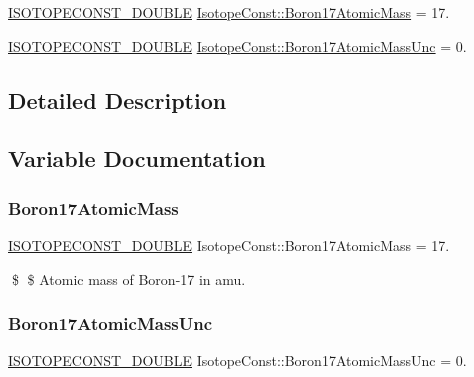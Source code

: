 \begin{DoxyCompactItemize}
\item 
\mbox{\hyperlink{group___isotope_const-_macros_ga8f45a7272ce02c0b4c65c44636ed719a}{I\+S\+O\+T\+O\+P\+E\+C\+O\+N\+S\+T\+\_\+\+D\+O\+U\+B\+LE}} \mbox{\hyperlink{group___isotope_const-_boron-_b17_ga5616ca5a656c254e4e7f03ea4de4c0ac}{Isotope\+Const\+::\+Boron17\+Atomic\+Mass}} = 17.
\item 
\mbox{\hyperlink{group___isotope_const-_macros_ga8f45a7272ce02c0b4c65c44636ed719a}{I\+S\+O\+T\+O\+P\+E\+C\+O\+N\+S\+T\+\_\+\+D\+O\+U\+B\+LE}} \mbox{\hyperlink{group___isotope_const-_boron-_b17_gad3cb8f812ed1fc6926c2b1475fffe654}{Isotope\+Const\+::\+Boron17\+Atomic\+Mass\+Unc}} = 0.
\end{DoxyCompactItemize}


\subsection{Detailed Description}


\subsection{Variable Documentation}
\mbox{\label{group___isotope_const-_boron-_b17_ga5616ca5a656c254e4e7f03ea4de4c0ac}} 
\subsubsection{\texorpdfstring{Boron17\+Atomic\+Mass}{Boron17AtomicMass}}
{\footnotesize\ttfamily \mbox{\hyperlink{group___isotope_const-_macros_ga8f45a7272ce02c0b4c65c44636ed719a}{I\+S\+O\+T\+O\+P\+E\+C\+O\+N\+S\+T\+\_\+\+D\+O\+U\+B\+LE}} Isotope\+Const\+::\+Boron17\+Atomic\+Mass = 17.}

\$ \$ Atomic mass of Boron-\/17 in amu. \mbox{\label{group___isotope_const-_boron-_b17_gad3cb8f812ed1fc6926c2b1475fffe654}} 
\subsubsection{\texorpdfstring{Boron17\+Atomic\+Mass\+Unc}{Boron17AtomicMassUnc}}
{\footnotesize\ttfamily \mbox{\hyperlink{group___isotope_const-_macros_ga8f45a7272ce02c0b4c65c44636ed719a}{I\+S\+O\+T\+O\+P\+E\+C\+O\+N\+S\+T\+\_\+\+D\+O\+U\+B\+LE}} Isotope\+Const\+::\+Boron17\+Atomic\+Mass\+Unc = 0.}

